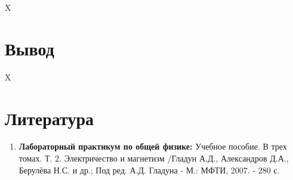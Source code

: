 \documentclass[a4paper, 12pt]{article}%
\begin{document}
X

\section{Вывод}

X

\section{Литература}

\begin{enumerate}
\item \textbf{Лабораторный практикум по общей физике:} Учебное пособие. В трех томах. Т. 2. Электричество и магнетизм /Гладун А.Д., Александров Д.А., Берулёва Н.С. и др.; Под ред. А.Д. Гладуна - М.: МФТИ, 2007. - 280 с.
\end{enumerate}		
		
					
\end{document}
